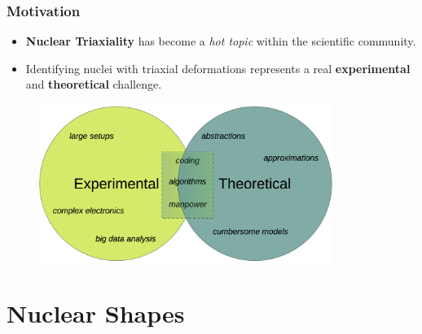 \documentclass{beamer}
\begin{document}
\begin{frame}
	\frametitle{Motivation}
    \vspace{-0.3cm}
    \begin{itemize}
        \item \textbf{Nuclear Triaxiality} has become a \emph{hot topic} within the scientific community.
        \item Identifying nuclei with triaxial deformations represents a real \textbf{experimental} and \textbf{theoretical} challenge.
    \end{itemize}
    \vspace{-0.2cm}
    \begin{figure}
        \centering
        \includegraphics[width=0.85\textwidth]{figures/exp_vs_theory.png}
    \end{figure}
\end{frame}


\section{Nuclear Shapes}
\end{document}
